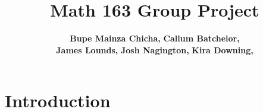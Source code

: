 \documentclass{article}
\author{
    {\bf Bupe Mainza Chicha,}
        {\bf Callum Batchelor,} \\
        {\bf James Lounds, }
        {\bf Josh Nagington, }
        {\bf Kira Downing, }
}
\title{Math 163 Group Project}
\begin{document}
\maketitle
\newpage
\tableofcontents
\newpage
\section{Introduction}
\end{document}
